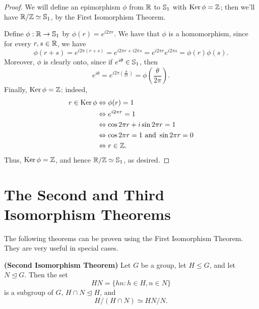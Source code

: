 \begin{proof} We will define an epimorphism $\phi$ from $\fatr$ to $\S_1$
with $\Ker \phi=\Z$; then we'll have $\fatr/\Z \simeq \S_1$,
by the First Isomorphism Theorem.

Define $\phi:\fatr \to \S_1$ by $\phi(r)=e^{i2\pi r}$. We have
that $\phi$ is a homomorphism, since for every $r,s\in \fatr$,
we have
$$\phi(r+s)=e^{i2\pi (r+s)}=e^{i2\pi r+i2\pi s}=e^{i2\pi
r}e^{i2\pi s}=\phi(r)\phi(s).$$  Moreover, $\phi$ is clearly
onto, since if $e^{i\theta}\in \S_1$, then
$$e^{i\theta}=e^{i2\pi\left(\frac{\theta}{2\pi}\right)}=\phi\left(\frac{\theta}{2\pi}\right).$$
Finally, $\Ker\phi=\Z$: indeed,
\begin{align*}
r\in \Ker\phi &\Leftrightarrow \phi(r)=1\\
&\Leftrightarrow e^{i2\pi r}=1 \\
&\Leftrightarrow \cos 2\pi r + i\sin 2\pi r=1 \\
&\Leftrightarrow \cos 2\pi r = 1 \mbox{ and }\sin 2\pi r = 0\\
&\Leftrightarrow r\in \Z.
\end{align*}
Thus, $\Ker \phi = \Z$, and hence $\fatr/\Z\simeq \S_1$, as
desired.\end{proof}

\section{The Second and Third Isomorphism Theorems}

\begin{comment}
\noindent \textbf{Corollary of the Correspondence Theorem.}  Let $G$
and $G'$ be groups, with epimorphism $\phi:G\rightarrow G'$ (note
that $\phi$ has to be onto).  Let $K=\Ker \phi$.  Then the [normal]
subgroups of $G'$ are in one-to-one correspondence with the [normal]
subgroups of $G$ containing $K$.  (Specifically, if $H\leq G$ with
$K\subseteq H$, then $H$ corresponds to $\phi(H)\leq G'$.)
\end{comment}

The following theorems can be proven using the First Isomorphism
Theorem. They are very useful in special cases.

\begin{thm}\label{}\textbf{(Second Isomorphism Theorem)} Let $G$ be a
group, let $H\leq G$, and let $N\unlhd G$. Then the set
$$HN=\{hn:h\in H, n\in N\}$$
is a subgroup of $G$, $H\cap N\unlhd H$, and $$H/(H\cap N) \simeq
HN/N.$$ \end{thm}

